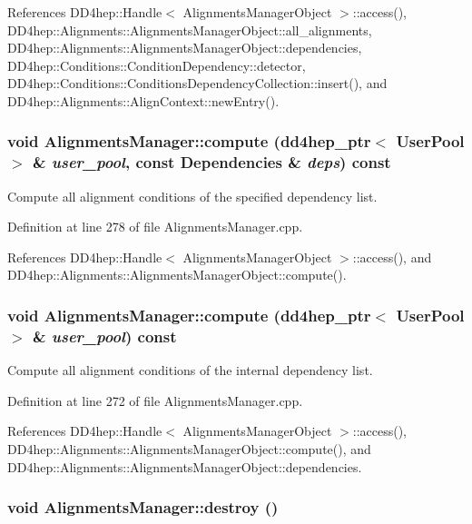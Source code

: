 References DD4hep::Handle$<$ AlignmentsManagerObject $>$::access(), DD4hep::Alignments::AlignmentsManagerObject::all\_\-alignments, DD4hep::Alignments::AlignmentsManagerObject::dependencies, DD4hep::Conditions::ConditionDependency::detector, DD4hep::Conditions::ConditionsDependencyCollection::insert(), and DD4hep::Alignments::AlignContext::newEntry().\hypertarget{class_d_d4hep_1_1_alignments_1_1_alignments_manager_ab7da4574491fb1e887cbfaabdd44c712}{
\subsubsection[{compute}]{\setlength{\rightskip}{0pt plus 5cm}void AlignmentsManager::compute ({\bf dd4hep\_\-ptr}$<$ UserPool $>$ \& {\em user\_\-pool}, \/  const {\bf Dependencies} \& {\em deps}) const}}
\label{class_d_d4hep_1_1_alignments_1_1_alignments_manager_ab7da4574491fb1e887cbfaabdd44c712}


Compute all alignment conditions of the specified dependency list. 

Definition at line 278 of file AlignmentsManager.cpp.

References DD4hep::Handle$<$ AlignmentsManagerObject $>$::access(), and DD4hep::Alignments::AlignmentsManagerObject::compute().\hypertarget{class_d_d4hep_1_1_alignments_1_1_alignments_manager_a2102612d6882f1ce61d2f12bfb0c871d}{
\subsubsection[{compute}]{\setlength{\rightskip}{0pt plus 5cm}void AlignmentsManager::compute ({\bf dd4hep\_\-ptr}$<$ UserPool $>$ \& {\em user\_\-pool}) const}}
\label{class_d_d4hep_1_1_alignments_1_1_alignments_manager_a2102612d6882f1ce61d2f12bfb0c871d}


Compute all alignment conditions of the internal dependency list. 

Definition at line 272 of file AlignmentsManager.cpp.

References DD4hep::Handle$<$ AlignmentsManagerObject $>$::access(), DD4hep::Alignments::AlignmentsManagerObject::compute(), and DD4hep::Alignments::AlignmentsManagerObject::dependencies.\hypertarget{class_d_d4hep_1_1_alignments_1_1_alignments_manager_aa4254e4ad73fb728b05d8c4134f1b7ac}{
\subsubsection[{destroy}]{\setlength{\rightskip}{0pt plus 5cm}void AlignmentsManager::destroy ()}}
\label{class_d_d4hep_1_1_alignments_1_1_alignments_manager_aa4254e4ad73fb728b05d8c4134f1b7ac}


